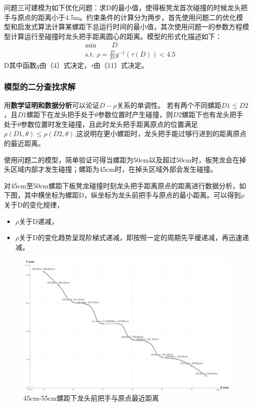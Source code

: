 \documentclass[a4paper]{article}
\begin{document}
 问题三可建模为如下优化问题：求D的最小值，使得板凳龙首次碰撞的时候龙头把手与原点的距离小于4.5m。约束条件的计算分为两步，首先使用问题二的优化模型和启发式算法计算某螺距下总运行时间的最小值，其次使用问题一的参数方程模型计算运行至碰撞时龙头把手距离圆心的距离。模型的形式化描述如下：
   		\begin{equation}
   \begin{aligned}
				& \min \quad \quad D \\
				& \text { s.t. }
    \rho = \frac{D}{2 \pi} g^{-1}(\tau(D))< 4.5
    \end{aligned}
		\end{equation}
      D其中函数$g$由（4）式决定，$\tau$由（11）式决定。
        \subsubsection{模型的二分查找求解}

        用\textbf{数学证明和数据分析}可以论证$D-\rho$关系的单调性。
        若有两个不同螺距$D1 \le D2$，且$D1$螺距下在龙头把手处于$\theta$参数位置时产生碰撞，则$D2$螺距下也有龙头把手处于$\theta$参数位置时发生碰撞，且此时龙头把手距离原点的位置满足$\rho(D1, \theta) \le \rho(D2, \theta)$,这说明在更小螺距时，龙头把手能过够行进到的距离原点的最近距离。

        使用问题二的模型，简单验证可得当螺距为50cm以及超过50cm时，板凳龙会在掉头区域内部才发生碰撞；螺距为45cm时，在掉头区域外部会发生碰撞。

        对45cm至50cm螺距下板凳龙碰撞时刻龙头把手距离原点的距离进行数据分析，如下图，其中横坐标为螺距D，纵坐标为龙头前把手与原点的最小距离。可以得到$\rho$关于D的变化规律，
        \begin{itemize}
        \item $\rho$关于D递减，
        \item $\rho$关于D的变化趋势呈现阶梯式递减，即按照一定的周期先平缓递减，再迅速递减。
        \end{itemize}
\begin{figure}
    \centering
    \includegraphics[width=0.5\linewidth]{image/analasis_3.png}
    \caption{45cm-55cm螺距下龙头前把手与原点最近距离}
    \label{fig:enter-label4}
\end{figure}
\end{document}
